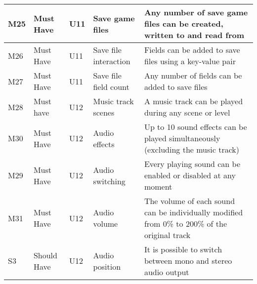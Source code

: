 \documentclass{article} %
\begin{document}
\begin{longtable}{|p{}|p{}|p{}|p{}|p{}|}
    M25                         & Must Have                          & U11                & Save game files             & Any number of save game files can be created, written to and read from                                                                                      \\ \hline
    M26                         & Must Have                          & U11                & Save file interaction       & Fields can be added to save files using a key-value pair                                                                                                    \\ \hline
    M27                         & Must Have                          & U11                & Save file field count       & Any number of fields can be added to save files                                                                                                             \\ \hline
    M28                         & Must have                          & U12                & Music track scenes          & A music track can be played during any scene or level                                                                                                       \\ \hline
    M30                         & Must Have                          & U12                & Audio effects               & Up to 10 sound effects can be played simultaneously (excluding the music track)                                                                             \\ \hline
    M29                         & Must Have                          & U12                & Audio switching             & Every playing sound can be enabled or disabled at any moment                                                                                                \\ \hline
    M31                         & Must Have                          & U12                & Audio volume                & The volume of each sound can be individually modified from 0\% to 200\% of the original track                                                               \\ \hline
    S3                          & Should Have                        & U12                & Audio position              & It is possible to switch between mono and stereo audio output                                                                                               \\ \hline

\end{longtable}
\end{document}
